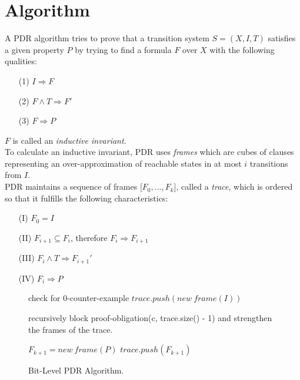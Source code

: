 \documentclass[11pt, a4paper, BCOR=10mm, ngerman]{scrbook}
\begin{document}
\section{Algorithm}
A PDR algorithm tries to prove that a transition system $S = (X, I, T)$ satisfies a given property $P$ by trying to find a formula $F$ over $X$ with the following qualities:
\begin{itemize}
\item[(1)] $I \Rightarrow F$
\item[(2)] $F \land T \Rightarrow F'$
\item[(3)] $F \Rightarrow P$
\end{itemize}
$F$ is called an \textsl{inductive invariant}. \\ 
To calculate an inductive invariant, PDR uses \textsl{frames} which are cubes of clauses representing an over-approximation of reachable states in at most $i$ transitions from $I$. \\
PDR maintains a sequence of frames [$F_0, ..., F_k$], called a \textsl{trace}, which is ordered so that it fulfills the following characteristics: 

\begin{itemize}
\item[(I)] $F_0 = I$
\item[(II)] $F_{i+1} \subseteq F_{i}$, therefore $F_i \Rightarrow F_{i+1}$
\item[(III)] $F_i \land T \Rightarrow F_{i+1}'$
\item[(IV)] $F_i \Rightarrow P$
\end{itemize}


\begin{figure}[H]
	\begin{algorithm}[H] 
		\begin{algorithmic}[1]
			\State check for 0-counter-example
			\State $trace.push(new\ frame(I))$
			\Statex
			\Loop
			
			\State recursively block proof-obligation(c, trace.size() - 1)
			\State and strengthen the frames of the trace.
			
			 
			\EndIf
			\EndWhile
			
			\Statex 
			
			\State $F_{k+1} = new\ frame(P)$
			\EndIf
			\EndFor
			\EndIf
			\State $trace.push(F_{k+1})$
			
			\EndLoop
			\EndProcedure
		\end{algorithmic}
	\end{algorithm}
	\caption{Bit-Level PDR Algorithm.}
\end{figure}
\end{document}

